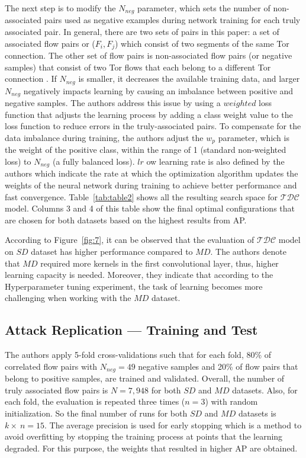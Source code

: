 \documentclass[sigconf]{acmart}
\begin{document}
The next step is to modify the $N_{neg}$ parameter, which sets the number of non-associated pairs used as negative examples during network training for each truly associated pair. In general, there are two sets of pairs in this paper: a set of associated flow pairs or ($F_{i}, F_{j}$) which consist of two segments of the same Tor connection. The other set of flow pairs is non-associated flow pairs (or negative samples) that consist of two Tor flows that each belong to a different Tor connection \cite{nasr2018deepcorr}. If $N_{neg}$ is smaller, it decreases the available training data, and larger $N_{neg}$ negatively impacts learning by causing an imbalance between positive and negative samples. The authors address this issue by using a $weighted$ loss function that adjusts the learning process by adding a class weight value to the loss function to reduce errors in the truly-associated pairs. To compensate for the data imbalance during training, the authors adjust the $w_{p}$ parameter, which is the weight of the positive class, within the range of 1 (standard non-weighted loss) to $N_{neg}$ (a fully balanced loss). $lr$ ow learning rate is also defined by the authors which indicate the rate at which the optimization algorithm updates the weights of the neural network during training to achieve better performance and fast convergence. Table~\ref{tab:table2} shows all the resulting search space for \( \mathcal{TDC} \) model. Columns 3 and 4 of this table show the final optimal configurations that are chosen for both datasets based on the highest results from AP.


According to Figure~\ref{fig:7}, it can be observed that the evaluation of \(\mathcal{TDC} \) model on $SD$ dataset has higher performance compared to $MD$. The authors denote that $MD$ required more kernels in the first convolutional layer, thus, higher learning capacity is needed. Moreover, they indicate that according to the Hyperparameter tuning experiment, the task of learning becomes more challenging when working with the $MD$ dataset.


\subsection{Attack Replication { }---{ } Training and Test} \label{7.2}


The authors apply 5-fold cross-validations such that for each fold, 80\% of correlated flow pairs with $N_{neg}=49$ negative samples and 20\% of flow pairs that belong to positive samples, are trained and validated. Overall, the number of truly associated flow pairs is $N = 7,948$ for both $SD$ and $MD$ datasets. Also, for each fold, the evaluation is repeated three times ($n=3$) with random initialization. So the final number of runs for both $SD$ and $MD$ datasets is $k\times\ n=15$. The average precision is used for early stopping which is a method to avoid overfitting by stopping the training process at points that the learning degraded. For this purpose, the weights that resulted in higher AP are obtained. 
\end{document}
